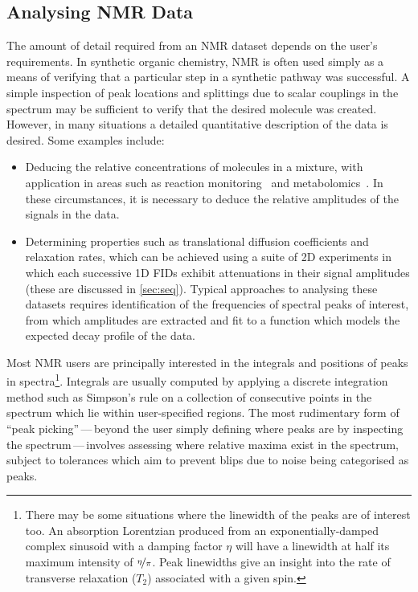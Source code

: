 \subsection{Analysing NMR Data}
\label{subsec:estimation-techniques}
The amount of detail required from an \ac{NMR} dataset depends on
the user's requirements. In synthetic organic chemistry, \ac{NMR} is often used
simply as a means of verifying that a particular step in a synthetic pathway
was successful. A simple inspection of peak locations and splittings due to
scalar couplings in the spectrum may be sufficient to verify that the desired
molecule was created. However, in many situations a detailed quantitative
description of the data is desired. Some examples include:
\begin{itemize}
    \item Deducing the relative concentrations of molecules in a mixture,
        with application in areas such as reaction
        monitoring~\cite{Bernstein2016} and metabolomics~\cite{Emwas2019}.
        In these circumstances, it is necessary to deduce the relative
        amplitudes of the signals in the data.
    \item Determining properties such as translational diffusion coefficients
        and relaxation rates, which can be achieved using a suite of \ac{2D}
        experiments in which each successive \ac{1D} \acp{FID} exhibit
        attenuations in their signal amplitudes (these are discussed in
        \cref{sec:seq}).  Typical approaches to analysing these datasets
        requires identification of the frequencies of spectral peaks of
        interest, from which amplitudes are extracted and fit to a
        function which models the expected decay profile of the data.
\end{itemize}

Most \ac{NMR} users are principally interested in the integrals and positions
of peaks in spectra\footnote{
    There may be some situations where the linewidth of the peaks are of
    interest too. An absorption Lorentzian produced from an
    exponentially-damped complex sinusoid with a damping factor $\eta$ will
    have a linewidth at half its maximum intensity of $\nicefrac{\eta}{\pi}$.
    Peak linewidths give an insight into the rate of transverse
    relaxation ($T_2$) associated with a given spin.
}.
Integrals are usually computed by applying a discrete integration method such
as Simpson's rule on a collection of consecutive points in the spectrum which
lie within user-specified regions.
The most rudimentary form of ``peak picking''\,---\,beyond the user
simply defining where peaks are by inspecting the spectrum\,---\,involves
assessing where relative maxima exist in the spectrum, subject to
tolerances which aim to prevent blips due to noise being categorised as
peaks.


